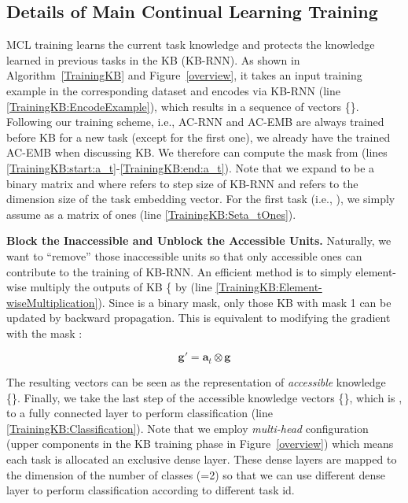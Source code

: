 \documentclass[runningheads]{llncs}
\begin{document}
\subsection{Details of Main Continual Learning Training}
\label{sec:KB}

MCL training learns the current task knowledge and protects the knowledge learned in previous tasks in the KB (KB-RNN). As shown in Algorithm~\ref{TrainingKB} and Figure~\ref{overview}, it takes an input training example  in the corresponding dataset  and encodes  via KB-RNN (line \ref{TrainingKB:EncodeExample}), which results in a sequence of vectors \{\}. Following our training scheme, i.e., AC-RNN and AC-EMB are always trained before KB for a new task  (except for the first one), we already have the trained AC-EMB  when discussing KB. We therefore can compute the mask  from  (lines \ref{TrainingKB:start:a_t}-\ref{TrainingKB:end:a_t}). Note that {\color{black}we expand  to be} a binary matrix and  where  refers to step size of KB-RNN and  refers to the dimension size of the task embedding vector. For the first task (i.e., ), we simply assume  as a matrix of ones (line \ref{TrainingKB:Seta_tOnes}).

\vspace{+4mm}
\noindent
\textbf{Block the Inaccessible and Unblock the Accessible Units.} Naturally, we want to ``remove'' those inaccessible units so that only accessible ones can contribute to the training of KB-RNN. An efficient method is to simply element-wise multiply the outputs of KB \{ by  (line \ref{TrainingKB:Element-wiseMultiplication}). Since  is a binary mask, only those KB with mask 1 can be updated by backward propagation. This is equivalent to modifying the gradient  with the mask :

\begin{dmath}
\bm{g'} = \bm{a}_t \otimes \bm{g}
\end{dmath}


The resulting vectors can be seen as the representation of {\em accessible} knowledge \{\}. 
Finally, we take the last step of the accessible knowledge vectors {\color{black}\{\}, which is ,} to a fully connected layer to perform classification (line \ref{TrainingKB:Classification}). Note that we employ {\em multi-head} configuration (upper components in the KB training phase in Figure~\ref{overview}) which means each task is allocated an exclusive dense layer. These dense layers are mapped to the dimension of the number of classes  (=2) so that we can use different dense layer to perform classification according to different task id. 
\end{document}
